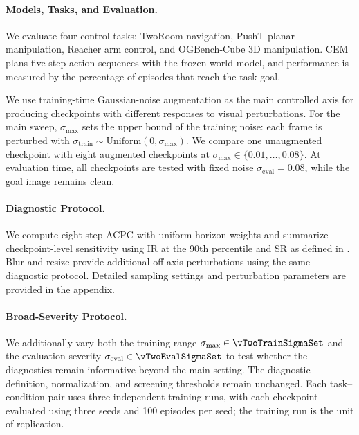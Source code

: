 \documentclass{article}
\begin{document}

\paragraph{Models, Tasks, and Evaluation.}
We evaluate four control tasks: TwoRoom navigation, PushT planar manipulation,
Reacher arm control, and OGBench-Cube 3D manipulation. CEM plans five-step
action sequences with the frozen world model, and performance is measured by
the percentage of episodes that reach the task goal.

We use training-time Gaussian-noise augmentation as the main controlled axis
for producing checkpoints with different responses to visual perturbations.
For the main sweep, $\sigma_{\max}$ sets the upper bound of the training noise:
each frame is perturbed with
$\sigma_{\mathrm{train}}\sim\mathrm{Uniform}(0,\sigma_{\max})$.
We compare one unaugmented checkpoint with eight augmented checkpoints at
$\sigma_{\max}\in\{0.01,\ldots,0.08\}$. At evaluation time, all checkpoints
are tested with fixed noise $\sigma_{\mathrm{eval}}=0.08$, while the goal
image remains clean.

\paragraph{Diagnostic Protocol.}
We compute eight-step ACPC with uniform horizon weights and summarize
checkpoint-level sensitivity using IR at the 90th percentile and SR as defined
in . Blur and resize provide additional off-axis
perturbations using the same diagnostic protocol. Detailed sampling settings
and perturbation parameters are provided in the appendix.

\paragraph{Broad-Severity Protocol.}
We additionally vary both the training range
$\sigma_{\max}\in\vTwoTrainSigmaSet$ and the evaluation severity
$\sigma_{\mathrm{eval}}\in\vTwoEvalSigmaSet$ to test whether the diagnostics
remain informative beyond the main setting. The diagnostic definition,
normalization, and screening thresholds remain unchanged. Each
task--condition pair uses three independent training runs, with each checkpoint
evaluated using three seeds and 100 episodes per seed; the training run is the
unit of replication.
\end{document}
